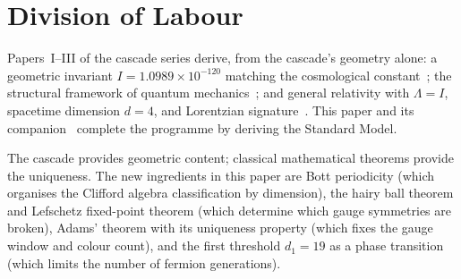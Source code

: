 \documentclass[12pt,a4paper]{article}
\begin{document}
\begin{abstract}
The companion paper~\cite{part4b} derives the fermion mass spectrum, gauge coupling
constants, and precision predictions from these structural results.
\end{abstract}

\tableofcontents
\newpage

\section{Division of Labour}\label{sec:division-of-labour}

Papers~I--III of the cascade series derive, from the cascade's geometry alone: a geometric
invariant $I=1.0989\times 10^{-120}$ matching the cosmological constant~\cite{part0}; the
structural framework of quantum mechanics~\cite{part2}; and general relativity with
$\Lambda=I$, spacetime dimension $d=4$, and Lorentzian signature~\cite{part3}. This
paper and its companion~\cite{part4b} complete the programme by deriving the Standard
Model.

The cascade provides geometric content; classical mathematical theorems provide the
uniqueness. The new ingredients in this paper are Bott periodicity (which organises the
Clifford algebra classification by dimension), the hairy ball theorem and Lefschetz
fixed-point theorem (which determine which gauge symmetries are broken), Adams' theorem
with its uniqueness property (which fixes the gauge window and colour count), and the
first threshold $d_1=19$ as a phase transition (which limits the number of fermion
generations).

\begin{center}
\end{center}
\end{document}
